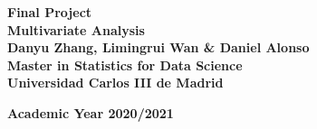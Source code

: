 \documentclass[a4paper,12pt]{article}
\begin{document}
	
		\begin{titlepage}
		\begin{center}
		\textbf{\LARGE Final Project}\\[0.5 cm]
		\textbf{\LARGE Multivariate Analysis}\\[5 cm]
        \textbf{\large Danyu Zhang, Limingrui Wan \& Daniel Alonso}\\[0.1cm]
        \textbf{\large Master in Statistics for Data Science}\\[0.1 cm]
        \textbf{\large Universidad Carlos III de Madrid}\\[1 cm]
        \begin{figure}[H]
		    \centering
		\end{figure}
		\textbf{Academic Year 2020/2021}    
		\end{center}
	    \end{titlepage} 
\end{document}
